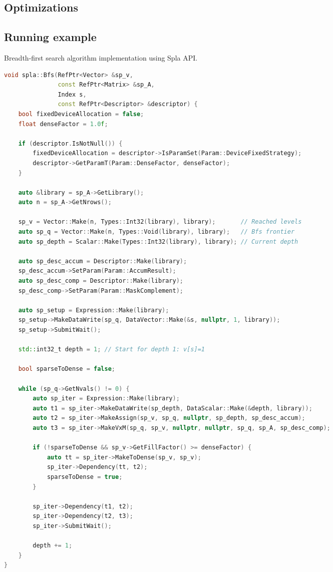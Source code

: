 \subsection{Optimizations}

\subsection{Running example}

\lstset{style=codelistingstyle}

\begin{algorithm}[]
\caption{Breadth-first search algorithm implementation using Spla API.}
\label{alg:spla_bfs_example}
\begin{lstlisting}[language=C++]
void spla::Bfs(RefPtr<Vector> &sp_v, 
               const RefPtr<Matrix> &sp_A, 
               Index s, 
               const RefPtr<Descriptor> &descriptor) {
    bool fixedDeviceAllocation = false;
    float denseFactor = 1.0f;

    if (descriptor.IsNotNull()) {
        fixedDeviceAllocation = descriptor->IsParamSet(Param::DeviceFixedStrategy);
        descriptor->GetParamT(Param::DenseFactor, denseFactor);
    }

    auto &library = sp_A->GetLibrary();
    auto n = sp_A->GetNrows();

    sp_v = Vector::Make(n, Types::Int32(library), library);       // Reached levels
    auto sp_q = Vector::Make(n, Types::Void(library), library);   // Bfs frontier
    auto sp_depth = Scalar::Make(Types::Int32(library), library); // Current depth

    auto sp_desc_accum = Descriptor::Make(library);
    sp_desc_accum->SetParam(Param::AccumResult);
    auto sp_desc_comp = Descriptor::Make(library);
    sp_desc_comp->SetParam(Param::MaskComplement);

    auto sp_setup = Expression::Make(library);
    sp_setup->MakeDataWrite(sp_q, DataVector::Make(&s, nullptr, 1, library));
    sp_setup->SubmitWait();

    std::int32_t depth = 1; // Start for depth 1: v[s]=1

    bool sparseToDense = false;

    while (sp_q->GetNvals() != 0) {
        auto sp_iter = Expression::Make(library);
        auto t1 = sp_iter->MakeDataWrite(sp_depth, DataScalar::Make(&depth, library));
        auto t2 = sp_iter->MakeAssign(sp_v, sp_q, nullptr, sp_depth, sp_desc_accum);
        auto t3 = sp_iter->MakeVxM(sp_q, sp_v, nullptr, nullptr, sp_q, sp_A, sp_desc_comp);

        if (!sparseToDense && sp_v->GetFillFactor() >= denseFactor) {
            auto tt = sp_iter->MakeToDense(sp_v, sp_v);
            sp_iter->Dependency(tt, t2);
            sparseToDense = true;
        }

        sp_iter->Dependency(t1, t2);
        sp_iter->Dependency(t2, t3);
        sp_iter->SubmitWait();

        depth += 1;
    }
}
\end{lstlisting}
\end{algorithm}

